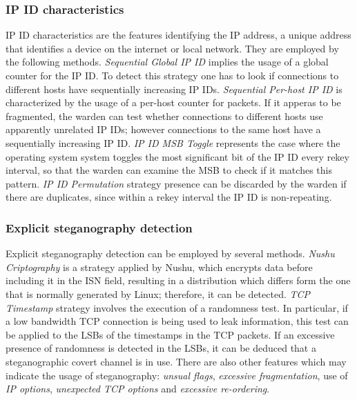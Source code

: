 \documentclass[../../main.tex]{subfiles}
\begin{document}
\subsubsection{IP ID characteristics}
IP ID characteristics are the features identifying the IP
address, a unique address that identifies a device on the internet or local
network. They are employed by the following methods.
\emph{Sequential Global IP ID} implies the usage of a global counter for the
IP ID. 
To detect this strategy one has to look if connections to different hosts
have sequentially increasing IP IDs.
\emph{Sequential Per-host IP ID} is characterized by the usage of a per-host
counter for packets. If it apperas to be fragmented, the warden can test
whether connections to different hosts use apparently unrelated IP IDs;
however connections to the same host have a sequentially increasing IP ID.
\emph{IP ID MSB Toggle} represents the case where the operating system
system toggles the most significant bit of the IP ID every rekey interval,
so that the warden can examine the MSB to check if it matches this pattern.
\emph{IP ID Permutation} strategy presence can be discarded by the warden if
there are duplicates, since within a rekey interval the IP ID is
non-repeating.

\subsubsection{Explicit steganography detection}
Explicit steganography detection can be employed by several
methods.
\emph{Nushu Criptography} is a strategy applied by Nushu, which encrypts
data before including it in the ISN field, resulting in a distribution which
differs form the one that is normally generated by Linux; therefore, it can
be detected. 
\emph{TCP Timestamp} strategy involves the execution of a randomness test.
In particular, if a low bandwidth TCP connection is being used to leak
information, this test can be applied to the LSBs of the timestamps in the
TCP packets. If an excessive presence of randomness is detected in the LSBs,
it can be deduced that a steganographic covert channel is in use.
There are also other features which may indicate the usage of steganography:
\emph{unsual flags}, \emph{excessive fragmentation}, use of \emph{IP
options}, \emph{unexpected TCP options} and \emph{excessive re-ordering}.
\end{document}
